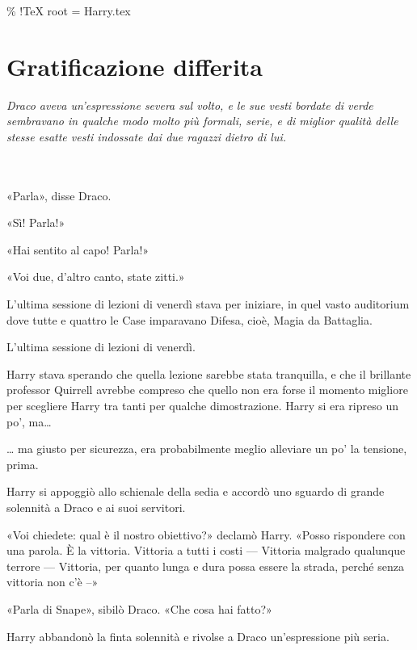 \% !TeX root = Harry.tex



\chapter{Gratificazione differita}

\label{capitolo:19}



\emph{Draco aveva un’espressione severa sul volto, e le sue vesti bordate di verde sembravano in qualche modo molto più formali, serie, e di miglior qualità delle stesse esatte vesti indossate dai due ragazzi dietro di lui.}



~\\

~\\



«Parla», disse Draco.

«Sì! Parla!»

«Hai sentito al capo! Parla!»

«Voi due, d’altro canto, state zitti.»

L’ultima sessione di lezioni di venerdì stava per iniziare, in quel vasto auditorium dove tutte e quattro le Case imparavano Difesa, cioè, Magia da Battaglia.

L’ultima sessione di lezioni di venerdì.

Harry stava sperando che quella lezione sarebbe stata tranquilla, e che il brillante professor Quirrell avrebbe compreso che quello non era forse il momento migliore per scegliere Harry tra tanti per qualche dimostrazione. Harry si era ripreso un po’, ma…

… ma giusto per sicurezza, era probabilmente meglio alleviare un po’ la tensione, prima.

Harry si appoggiò allo schienale della sedia e accordò uno sguardo di grande solennità a Draco e ai suoi servitori.

«Voi chiedete: qual è il nostro obiettivo?» declamò Harry. «Posso rispondere con una parola. È la vittoria. Vittoria a tutti i costi — Vittoria malgrado qualunque terrore — Vittoria, per quanto lunga e dura possa essere la strada, perché senza vittoria non c’è –»

«Parla di Snape», sibilò Draco. «Che cosa hai fatto?»

Harry abbandonò la finta solennità e rivolse a Draco un’espressione più seria.

